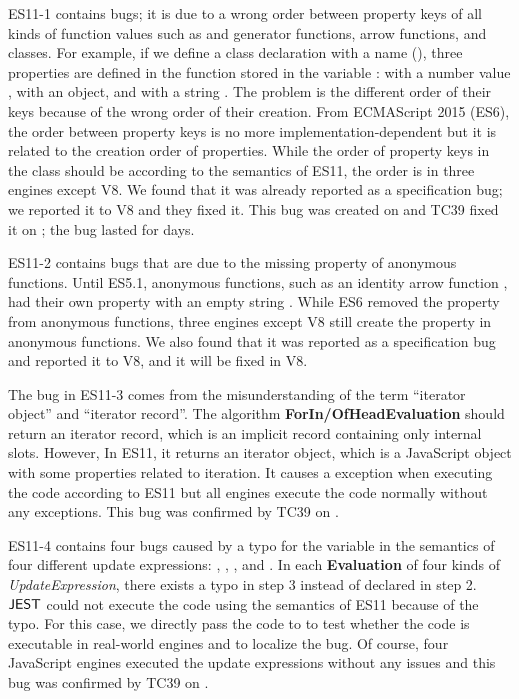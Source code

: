ES11-1 contains  bugs; it is due to a wrong order between property keys of all kinds of
function values such as  and generator functions, arrow functions, and classes.
For example, if we define a class declaration with a name 
(), three properties are defined in the function
stored in the variable :  with a number value ,
 with an object, and  with a string .
The problem is the different order of their keys because of
the wrong order of their creation.
From ECMAScript 2015 (ES6), the order between property keys is no
more implementation-dependent but it is related to the creation order of properties.
While the order of property keys in the class  should be 
according to the semantics of ES11, the order is 
in three engines except V8.  We found that it was already reported as a specification bug;
we reported it to V8 and they fixed it.
This bug was created on  and TC39 fixed it on ;
the bug lasted for  days.

ES11-2 contains  bugs that are due to the missing property
 of anonymous functions.  Until ES5.1, anonymous functions, such as an identity arrow
function , had their own property  with an empty string .
While ES6 removed the  property from anonymous functions,
three engines except V8 still create the  property in anonymous functions.
We also found that it was reported as a specification bug and reported it
to V8, and it will be fixed in V8.

The bug in ES11-3 comes from the misunderstanding of the term ``iterator
object'' and ``iterator record''.  The algorithm \textbf{ForIn/OfHeadEvaluation}
should return an iterator record, which is an implicit record containing only internal slots.
However, In ES11, it returns an iterator object, which is a
JavaScript object with some properties related to iteration.
It causes a  exception when executing the code  according to
ES11 but all engines execute the code normally without any exceptions.
This bug was confirmed by TC39 on .

ES11-4 contains four bugs caused by a typo for the variable in the
semantics of four different update expressions: , ,
, and .  In each \textbf{Evaluation} of four kinds of
\textit{UpdateExpression}, there exists a typo  in step 3
instead of  declared in step 2.  $\tool$ could not execute
the code  using the semantics of ES11 because of the typo.
For this case, we directly pass the code to  to test whether the
code is executable in real-world engines and to localize the bug.
Of course, four JavaScript engines executed the update expressions without any issues
and this bug was confirmed by TC39 on .

